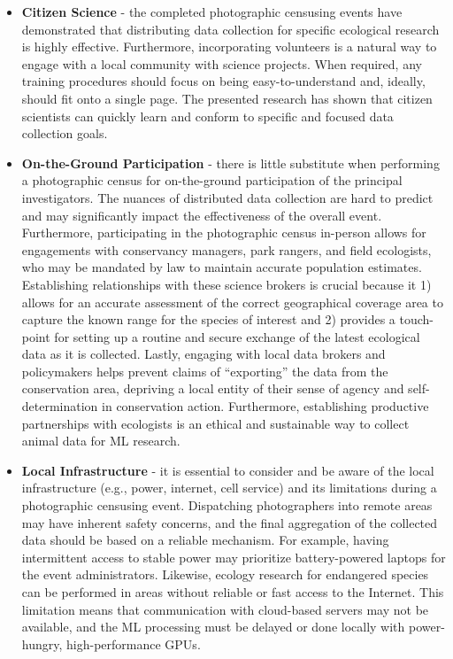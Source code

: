 \begin{itemize}
    \item \textbf{Citizen Science} - the completed photographic censusing events have demonstrated that distributing data collection for specific ecological research is highly effective.  Furthermore, incorporating volunteers is a natural way to engage with a local community with science projects.  When required, any training procedures should focus on being easy-to-understand and, ideally, should fit onto a single page.  The presented research has shown that citizen scientists can quickly learn and conform to specific and focused data collection goals.
    \item \textbf{On-the-Ground Participation} - there is little substitute when performing a photographic census for on-the-ground participation of the principal investigators.  The nuances of distributed data collection are hard to predict and may significantly impact the effectiveness of the overall event.  Furthermore, participating in the photographic census in-person allows for engagements with conservancy managers, park rangers, and field ecologists, who may be mandated by law to maintain accurate population estimates.  Establishing relationships with these science brokers is crucial because it 1) allows for an accurate assessment of the correct geographical coverage area to capture the known range for the species of interest and 2) provides a touch-point for setting up a routine and secure exchange of the latest ecological data as it is collected.  Lastly, engaging with local data brokers and policymakers helps prevent claims of ``exporting'' the data from the conservation area, depriving a local entity of their sense of agency and self-determination in conservation action.  Furthermore, establishing productive partnerships with ecologists is an ethical and sustainable way to collect animal data for ML research.
    \item \textbf{Local Infrastructure} - it is essential to consider and be aware of the local infrastructure (e.g., power, internet, cell service) and its limitations during a photographic censusing event.  Dispatching photographers into remote areas may have inherent safety concerns, and the final aggregation of the collected data should be based on a reliable mechanism.  For example, having intermittent access to stable power may prioritize battery-powered laptops for the event administrators.  Likewise, ecology research for endangered species can be performed in areas without reliable or fast access to the Internet.  This limitation means that communication with cloud-based servers may not be available, and the ML processing must be delayed or done locally with power-hungry, high-performance GPUs.

\end{itemize}
